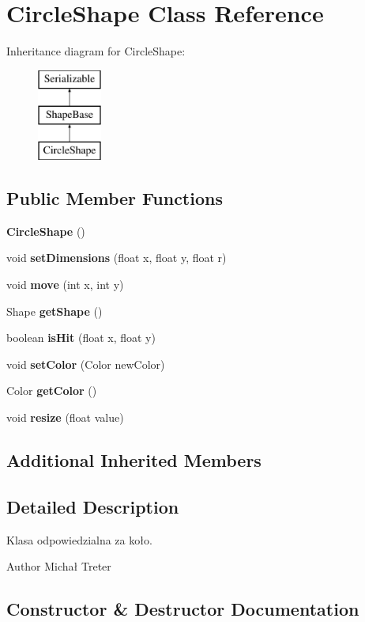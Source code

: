 \section{Circle\+Shape Class Reference}
\label{class_circle_shape}
Inheritance diagram for Circle\+Shape\+:\begin{figure}[H]
\begin{center}
\leavevmode
\includegraphics[height=3.000000cm]{class_circle_shape}
\end{center}
\end{figure}
\subsection*{Public Member Functions}
\begin{DoxyCompactItemize}
\item 
\textbf{ Circle\+Shape} ()
\item 
void \textbf{ set\+Dimensions} (float x, float y, float r)
\item 
void \textbf{ move} (int x, int y)
\item 
Shape \textbf{ get\+Shape} ()
\item 
boolean \textbf{ is\+Hit} (float x, float y)
\item 
void \textbf{ set\+Color} (Color new\+Color)
\item 
Color \textbf{ get\+Color} ()
\item 
void \textbf{ resize} (float value)
\end{DoxyCompactItemize}
\subsection*{Additional Inherited Members}


\subsection{Detailed Description}
Klasa odpowiedzialna za koło. \begin{DoxyAuthor}{Author}
Michał Treter 
\end{DoxyAuthor}


\subsection{Constructor \& Destructor Documentation}
\mbox{\label{class_circle_shape_a7f25499c232d3e71ce60fb94ff957aa0}} 

